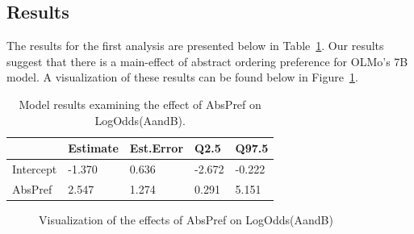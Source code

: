 \documentclass[
  10pt,
  nohyperref]{acl}
\begin{document}
\subsection{Results}\label{results}

The results for the first analysis are presented below in
Table~\ref{tbl-exp1m1}. Our results suggest that there is a main-effect
of abstract ordering preference for OLMo's 7B model. A visualization of
these results can be found below in Figure~\ref{fig-exp1m1}.

\begin{longtable}[]{@{}lllll@{}}

\caption{\label{tbl-exp1m1}Model results examining the effect of AbsPref
on LogOdds(AandB).}

\tabularnewline

\toprule\noalign{}
& Estimate & Est.Error & Q2.5 & Q97.5 \\
\midrule\noalign{}
\endhead
\bottomrule\noalign{}
\endlastfoot
Intercept & -1.370 & 0.636 & -2.672 & -0.222 \\
AbsPref & 2.547 & 1.274 & 0.291 & 5.151 \\

\end{longtable}

\begin{figure}


\caption{\label{fig-exp1m1}Visualization of the effects of AbsPref on
LogOdds(AandB)}

\end{figure}%
\end{document}
